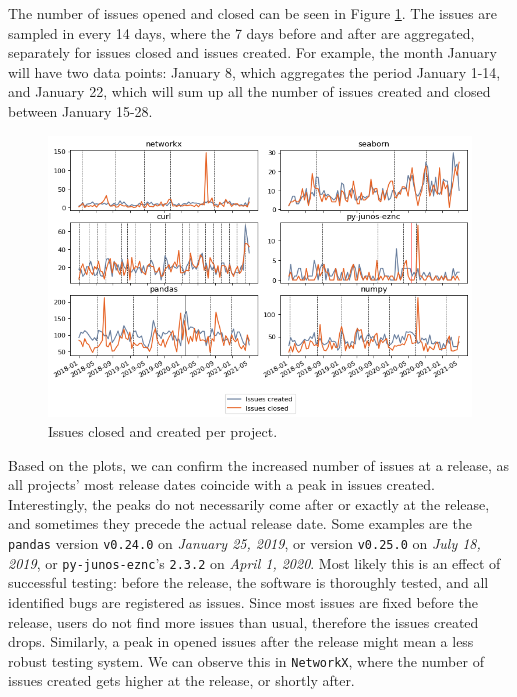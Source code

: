 The number of issues opened and closed can be seen in Figure \ref{fig:issues_created_closed}. The issues are sampled in every 14 days, where the 7 days before and after are aggregated, separately for issues closed and issues created. For example, the month January will have two data points: January 8, which aggregates the period January 1-14, and January 22, which will sum up all the number of issues created and closed between January 15-28.

\begin{figure}
    \centering
    \includegraphics[width=\textwidth]{figures/qualitative/issues_closed_created/issues.png}
    \caption{Issues closed and created per project.}
    \label{fig:issues_created_closed}
\end{figure}

Based on the plots, we can confirm the increased number of issues at a release, as all projects' most release dates coincide with a peak in issues created. Interestingly, the peaks do not necessarily come after or exactly at the release, and sometimes they precede the actual release date. Some examples are the \texttt{pandas} version \texttt{v0.24.0} on \textit{January 25, 2019}, or version \texttt{v0.25.0} on \textit{July 18, 2019}, or \texttt{py-junos-eznc}'s \texttt{2.3.2} on \textit{April 1, 2020}. Most likely this is an effect of successful testing: before the release, the software is thoroughly tested, and all identified bugs are registered as issues. Since most issues are fixed before the release, users do not find more issues than usual, therefore the issues created drops. Similarly, a peak in opened issues after the release might mean a less robust testing system. We can observe this in \texttt{NetworkX}, where the number of issues created gets higher at the release, or shortly after.

